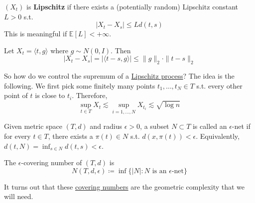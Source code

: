 \begin{definition}
  \label{def:lipschitz-process}
  $(X_t)$ is \textbf{Lipschitz} if there exists a (potentially random) Lipschitz constant $L > 0$ s.t. 
	\begin{equation}
	  |X_t - X_s| \leq L d(t, s)
	\end{equation}
	This is meaningful if $\mathbb{E}[L] < +\infty$. 
\end{definition}

\begin{example}
  \label{ex:canonical-gaussian-process-increments}
  Let $X_t = \langle t, g \rangle$ where $g \sim N(0, I)$. Then 
	\begin{equation}
	  |X_t - X_s| = |\langle t - s, g \rangle| \leq \|g\|_2 \cdot \|t - s\|_2
	\end{equation}
\end{example}

So how do we control the supremum of a \hyperref[def:lipschitz-process]{Lipschitz process}? The idea is the following. We first pick some finitely many points $t_1, \ldots, t_N \in T$ s.t. every other point of $t$ is close to $t_i$. Therefore, 
\begin{equation}
	\sup_{t \in T} X_t \lesssim \sup_{i = 1, \ldots, N} X_{t_i} \lesssim \sqrt{\log{n}}
\end{equation}

\begin{definition}
  \label{def:covering-number}
	Given metric space $(T, d)$ and radius $\epsilon > 0$, a subset $N \subset T$ is called an $\epsilon$-net if for every $t \in T$, there exists a $\pi(t) \in N$ s.t. $d(x, \pi(t)) < \epsilon$. Equivalently, $d(t, N) = \inf_{s \in N} d(t, s) < \epsilon$. 

	The $\epsilon$-covering number of $(T, d)$ is 
	\begin{equation}
		N(T, d, \epsilon) \coloneqq \inf \big\{ |N| \colon N \text{ is an } \epsilon \text{-net} \big\}
	\end{equation}
\end{definition}

It turns out that these \hyperref[def:covering-number]{covering numbers} are the geometric complexity that we will need. 

